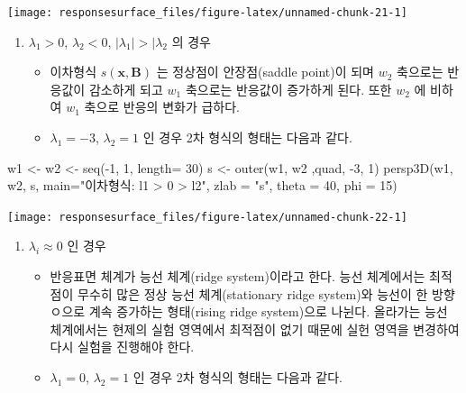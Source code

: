 \documentclass[
]{book}
\newenvironment{Shaded}{\begin{snugshade}}{\end{snugshade}}
\newcommand{\AttributeTok}[1]{\textcolor[rgb]{0.77,0.63,0.00}{#1}}
\newcommand{\DecValTok}[1]{\textcolor[rgb]{0.00,0.00,0.81}{#1}}
\newcommand{\FunctionTok}[1]{\textcolor[rgb]{0.00,0.00,0.00}{#1}}
\newcommand{\NormalTok}[1]{#1}
\newcommand{\OtherTok}[1]{\textcolor[rgb]{0.56,0.35,0.01}{#1}}
\newcommand{\SpecialCharTok}[1]{\textcolor[rgb]{0.00,0.00,0.00}{#1}}
\newcommand{\StringTok}[1]{\textcolor[rgb]{0.31,0.60,0.02}{#1}}
\newcommand{\bm}[1]{\boldsymbol{\mathbf{#1}}}
\theoremstyle{definition}
\theoremstyle{definition}
\theoremstyle{definition}
\theoremstyle{definition}
\theoremstyle{remark}
\begin{document}
\begin{center}\texttt{[image: responsesurface\_files/figure-latex/unnamed-chunk-21-1]} \end{center}

\begin{enumerate}
\def\labelenumi{\arabic{enumi}.}
\setcounter{enumi}{2}
\item
  \(\lambda_1 >0\), \(\lambda_2 <0\), \(|\lambda_1| > |\lambda_2\) 의 경우

  \begin{itemize}
  \item
    이차형식 \(s(\bm x, \bm B)\) 는 정상점이 안장점(saddle point)이 되며 \(w_2\) 축으로는 반응값이 감소하게 되고 \(w_1\) 축으로는 반응값이 증가하게 된다. 또한 \(w_2\) 에 비하여 \(w_1\) 축으로 반응의 변화가 급하다.
  \item
    \(\lambda_1 = - 3\), \(\lambda_2 =1\) 인 경우 2차 형식의 형태는 다음과 같다.
  \end{itemize}
\end{enumerate}

\begin{Shaded}
\begin{Highlighting}[]
\NormalTok{w1 }\OtherTok{\textless{}{-}}\NormalTok{ w2 }\OtherTok{\textless{}{-}} \FunctionTok{seq}\NormalTok{(}\SpecialCharTok{{-}}\DecValTok{1}\NormalTok{, }\DecValTok{1}\NormalTok{, }\AttributeTok{length=} \DecValTok{30}\NormalTok{)}
\NormalTok{s }\OtherTok{\textless{}{-}} \FunctionTok{outer}\NormalTok{(w1, w2 ,quad, }\SpecialCharTok{{-}}\DecValTok{3}\NormalTok{, }\DecValTok{1}\NormalTok{)}
\FunctionTok{persp3D}\NormalTok{(w1, w2, s,}
      \AttributeTok{main=}\StringTok{"이차형식: l1 \textgreater{}  0  \textgreater{} l2"}\NormalTok{,}
      \AttributeTok{zlab =} \StringTok{"s"}\NormalTok{,}
      \AttributeTok{theta =} \DecValTok{40}\NormalTok{, }\AttributeTok{phi =} \DecValTok{15}\NormalTok{)}
\end{Highlighting}
\end{Shaded}

\begin{center}\texttt{[image: responsesurface\_files/figure-latex/unnamed-chunk-22-1]} \end{center}

\begin{enumerate}
\def\labelenumi{\arabic{enumi}.}
\setcounter{enumi}{3}
\item
  \(\lambda_i \approx 0\) 인 경우

  \begin{itemize}
  \item
    반응표면 체계가 능선 체계(ridge system)이라고 한다. 능선 체계에서는 최적점이 무수히 많은 정상 능선 체계(stationary ridge system)와 능선이 한 방향ㅇ으로 계속 증가하는 형태(rising ridge system)으로 나뉜다. 올라가는 능선 체계에서는 현제의 실험 영역에서 최적점이 없기 때문에 실헌 영역을 변경하여 다시 실험을 진행해야 한다.
  \item
    \(\lambda_1 = 0\), \(\lambda_2 =1\) 인 경우 2차 형식의 형태는 다음과 같다.
  \end{itemize}
\end{enumerate}
\end{document}

